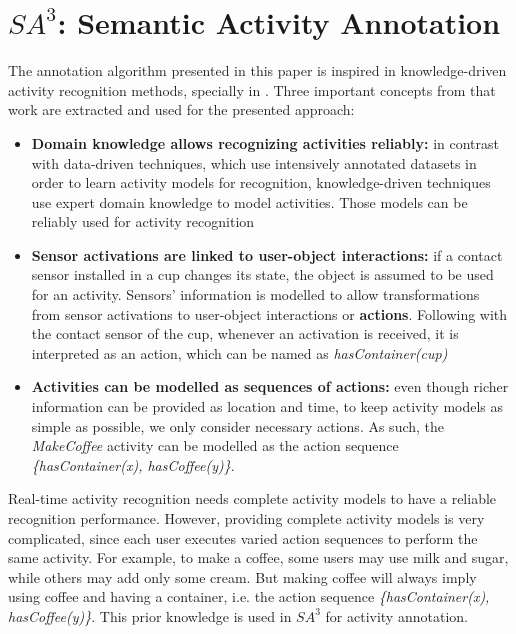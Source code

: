 \section{$SA^3$: Semantic Activity Annotation}
\label{sec:clustering:sa3}

The annotation algorithm presented in this paper is inspired in knowledge-driven activity recognition methods, specially in \cite{Chen2012a}. Three important concepts from that work are extracted and used for the presented approach:

\begin{itemize}
 \item \textbf{Domain knowledge allows recognizing activities reliably:} in contrast with data-driven techniques, which use intensively annotated datasets in order to learn activity models for recognition, knowledge-driven techniques use expert domain knowledge to model activities. Those models can be reliably used for activity recognition
 \item \textbf{Sensor activations are linked to user-object interactions:} if a contact sensor installed in a cup changes its state, the object is assumed to be used for an activity. Sensors' information is modelled to allow transformations from sensor activations to user-object interactions or \textbf{actions}. Following with the contact sensor of the cup, whenever an activation is received, it is interpreted as an action, which can be named as \textit{hasContainer(cup)}
 \item \textbf{Activities can be modelled as sequences of actions:} even though richer information can be provided as location and time, to keep activity models as simple as possible, we only consider necessary actions. As such, the \textit{MakeCoffee} activity can be modelled as the action sequence \textit{\{hasContainer(x), hasCoffee(y)\}}.
\end{itemize}

Real-time activity recognition needs complete activity models to have a reliable recognition performance. However, providing complete activity models is very complicated, since each user executes varied action sequences to perform the same activity. For example, to make a coffee, some users may use milk and sugar, while others may add only some cream. But making coffee will always imply using coffee and having a container, i.e. the action sequence \textit{\{hasContainer(x), hasCoffee(y)\}}. This prior knowledge is used in $SA^3$ for activity annotation.

